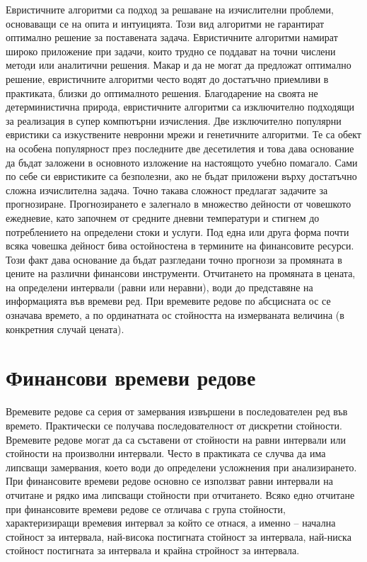\documentclass[book,14pt,oneside,openany]{memoir}
\begin{document}
Евристичните алгоритми са подход за решаване на изчислителни проблеми, основаващи се на опита и интуицията. Този вид алгоритми не гарантират оптимално решение за поставената задача. Евристичните алгоритми намират широко приложение при задачи, които трудно се поддават на точни числени методи или аналитични решения. Макар и да не могат да предложат оптимално решение, евристичните алгоритми често водят до достатъчно приемливи в практиката, близки до оптималното решения. Благодарение на своята не детерминистична природа, евристичните алгоритми са изключително подходящи за реализация в супер компютърни изчисления. Две изключително популярни евристики са изкуствените невронни мрежи и генетичните алгоритми. Те са обект на особена популярност през последните две десетилетия и това дава основание да бъдат заложени в основното изложение на настоящото учебно помагало. Сами по себе си евристиките са безполезни, ако не бъдат приложени върху достатъчно сложна изчислителна задача. Точно такава сложност предлагат задачите за прогнозиране. Прогнозирането е залегнало в множество дейности от човешкото ежедневие, като започнем от средните дневни температури и стигнем до потреблението на определени стоки и услуги. Под една или друга форма почти всяка човешка дейност бива остойностена в термините на финансовите ресурси. Този факт дава основание да бъдат разгледани точно прогнози за промяната в цените на различни финансови инструменти. Отчитането на промяната в цената, на определени интервали (равни или неравни), води до представяне на информацията във времеви ред. При времевите редове по абсцисната ос се означава времето, а по ординатната ос стойността на измерваната величина (в конкретния случай цената).

\section{Финансови времеви редове}

Времевите редове са серия от замервания извършени в последователен ред във времето. Практически се получава последователност от дискретни стойности. Времевите редове могат да са съставени от стойности на равни интервали или стойности на произволни интервали. Често в практиката се случва да има липсващи замервания, което води до определени усложнения при анализирането. При финансовите времеви редове основно се използват равни интервали на отчитане и рядко има липсващи стойности при отчитането. Всяко едно отчитане при финансовите времеви редове се отличава с група стойности, характеризиращи времевия интервал за който се отнася, а именно – начална стойност за интервала, най-висока постигната стойност за интервала, най-ниска стойност постигната за интервала и крайна стройност за интервала. 
\end{document}
